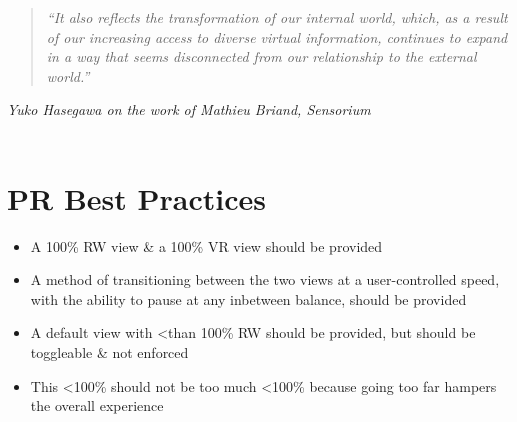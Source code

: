 \begin{quote}
	\textit{``It also reflects the transformation of our internal world, which, as a result of our increasing access to diverse virtual information, continues to expand in a way that seems disconnected from our relationship to the external world.''}
\end{quote}
\hfill \textit{Yuko Hasegawa on the work of Mathieu Briand, Sensorium}
\\
\\




\section{PR Best Practices}

\begin{itemize}
	\item A 100\% RW view \& a 100\% VR view should be provided
	\item A method of transitioning between the two views at a user-controlled speed, with the ability to pause at any inbetween balance, should be provided
	\item A default view with \textless than 100\% RW should be provided, but should be toggleable \& not enforced
	\item This \textless 100\% should not be too much \textless 100\% because going too far hampers the overall experience
\end{itemize}







